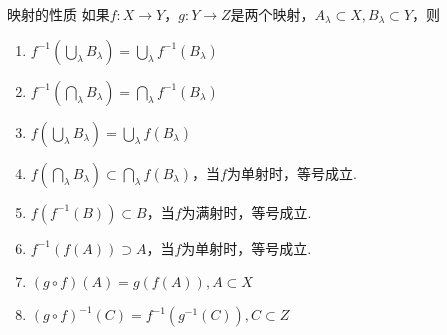 \begin{proposition}{映射的性质}
    \wideline
    如果$f:X\to Y$，$g:Y\to Z$是两个映射，$A_\lambda\subset X,B_\lambda \subset Y$，则
    \begin{enumerate}
        \item $f^{-1}\left(\bigcup_{\lambda}{B_\lambda}\right)=\bigcup_{\lambda}{f^{-1}(B_\lambda)}$
        \item $f^{-1}\left(\bigcap_{\lambda}{B_\lambda}\right)=\bigcap_{\lambda}{f^{-1}(B_\lambda)}$
        \item $f\left(\bigcup_{\lambda}{B_\lambda}\right)=\bigcup_{\lambda}{f(B_\lambda)}$
        \item $f\left(\bigcap_{\lambda}{B_\lambda}\right)\subset\bigcap_{\lambda}{f(B_\lambda)}$，当$f$为单射时，等号成立.
        \item $f\left(f^{-1}(B)\right)\subset B$，当$f$为满射时，等号成立.
        \item $f^{-1}\left(f(A)\right)\supset A$，当$f$为单射时，等号成立.
        \item $(g\circ f)(A)=g \left(f(A)\right),A\subset X$
        \item $(g\circ f)^{-1}(C)=f^{-1}\left(g^{-1}(C)\right),C\subset Z$
    \end{enumerate}
\end{proposition}
